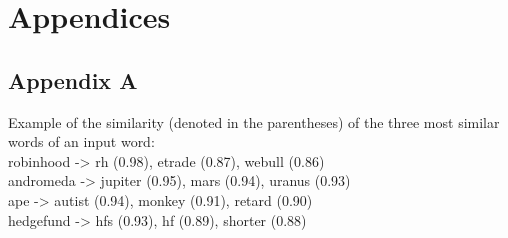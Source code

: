 \documentclass[11pt, a4paper]{article}
\begin{document}



\section{Appendices}
\subsection{Appendix A}
\label{appendix:A}

Example of the similarity (denoted in the parentheses) of the three most similar words of an input word: \\
robinhood -> rh (0.98), etrade (0.87), webull (0.86) \\
andromeda -> jupiter (0.95), mars (0.94), uranus (0.93) \\
ape -> autist (0.94), monkey (0.91), retard (0.90) \\
hedgefund -> hfs (0.93), hf (0.89), shorter (0.88) \\
\end{document}
